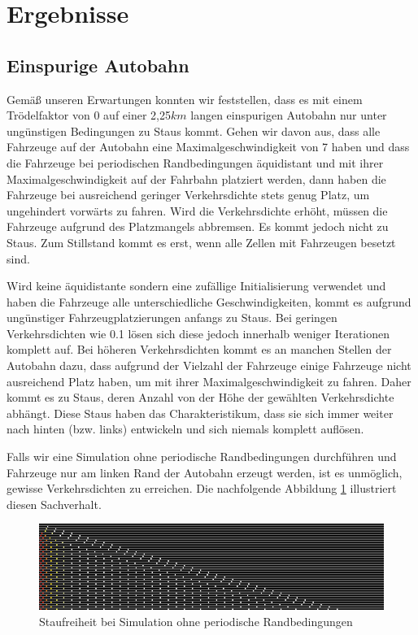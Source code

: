 \documentclass[10pt, a4paper]{article}
\begin{document}
\section{Ergebnisse}
\label{sec:ergebnisse}

\subsection{Einspurige Autobahn}
\label{subsec:einspurig}

Gemäß unseren Erwartungen konnten wir feststellen, dass es mit einem Trödelfaktor von 0 auf einer 2,25$km$ langen einspurigen Autobahn nur unter ungünstigen Bedingungen zu Staus kommt. Gehen wir davon aus, dass alle Fahrzeuge auf der Autobahn eine Maximalgeschwindigkeit von 7 haben und dass die Fahrzeuge bei periodischen Randbedingungen äquidistant und mit ihrer Maximalgeschwindigkeit auf der Fahrbahn platziert werden, dann haben die Fahrzeuge bei ausreichend geringer Verkehrsdichte stets genug Platz, um ungehindert vorwärts zu fahren. Wird die Verkehrsdichte erhöht, müssen die Fahrzeuge aufgrund des Platzmangels abbremsen. Es kommt jedoch nicht zu Staus. Zum Stillstand kommt es erst, wenn alle Zellen mit Fahrzeugen besetzt sind.

Wird keine äquidistante sondern eine zufällige Initialisierung verwendet und haben die Fahrzeuge alle unterschiedliche Geschwindigkeiten, kommt es aufgrund ungünstiger Fahrzeugplatzierungen anfangs zu Staus. Bei geringen Verkehrsdichten wie 0.1 lösen sich diese jedoch innerhalb weniger Iterationen komplett auf. Bei höheren Verkehrsdichten kommt es an manchen Stellen der Autobahn dazu, dass aufgrund der Vielzahl der Fahrzeuge einige Fahrzeuge nicht ausreichend Platz haben, um mit ihrer Maximalgeschwindigkeit zu fahren. Daher kommt es zu Staus, deren Anzahl von der Höhe der gewählten Verkehrsdichte abhängt. Diese Staus haben das Charakteristikum, dass sie sich immer weiter nach hinten (bzw. links) entwickeln und sich niemals komplett auflösen.

Falls wir eine Simulation ohne periodische Randbedingungen durchführen und Fahrzeuge nur am linken Rand der Autobahn erzeugt werden, ist es unmöglich, gewisse Verkehrsdichten zu erreichen. Die nachfolgende Abbildung \ref{fig:ergEinspurigKeinWraparoundKeinStau} illustriert diesen Sachverhalt.

\begin{figure}[h!]
	\centering
	\includegraphics[width=\textwidth]{img/erg_einspurig_kein_wraparound_dichte_0_5}
	\caption{Staufreiheit bei Simulation ohne periodische Randbedingungen}
	\label{fig:ergEinspurigKeinWraparoundKeinStau}
\end{figure}
\end{document}
